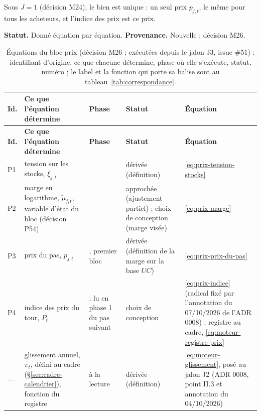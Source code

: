 \documentclass[11pt,a4paper]{article}
\begin{document}
Sous $J = 1$ (décision M24), le bien est unique : un seul prix $p_{j,t}$, le même pour tous les acheteurs, et l'indice des prix est ce prix.

\textbf{Statut.} Donné équation par équation. \textbf{Provenance.} Nouvelle ; décision M26.

\begin{center}\footnotesize
\setlength{\tabcolsep}{4pt}
\begin{longtable}{>{\raggedright\arraybackslash}p{0.8cm}>{\raggedright\arraybackslash}p{4.4cm}>{\raggedright\arraybackslash}p{1.4cm}>{\raggedright\arraybackslash}p{3.6cm}>{\raggedright\arraybackslash}p{4.5cm}}
\caption{Équations du bloc prix (décision M26 ; exécutées depuis le jalon J3, issue \#51) : identifiant d'origine, ce que chacune détermine, phase où elle s'exécute, statut, numéro ; le label et la fonction qui porte sa balise sont au tableau~\ref{tab:correspondance}.}\label{tab:prix-equations}\\
\toprule
\textbf{Id.} & \textbf{Ce que l'équation détermine} & \textbf{Phase} & \textbf{Statut} & \textbf{Équation}\\
\midrule
\endfirsthead
\toprule
\textbf{Id.} & \textbf{Ce que l'équation détermine} & \textbf{Phase} & \textbf{Statut} & \textbf{Équation}\\
\midrule
\endhead
P1 & tension sur les stocks, $\xi_{j,t}$ & 5 & dérivée (définition) & \eqref{eq:prix-tension-stocks}\\
P2 & marge en logarithme, $\tilde\mu_{j,t}$, variable d'état du bloc (décision P54) & 5 & approchée (ajustement partiel) ; choix de conception (marge visée) & \eqref{eq:prix-marge}\\
P3 & prix du pas, $p_{j,t}$ & 5, premier bloc & dérivée (définition de la marge sur la base $\mathit{UC}$) & \eqref{eq:prix-prix-du-pas}\\
P4 & indice des prix du tour, $P_t$ & 5 ; lu en phase 1 du pas suivant & choix de conception & \eqref{eq:prix-indice} (radical fixé par l'annotation du 07/10/2026 de l'ADR 0008) ; registre au cadre, \eqref{eq:moteur-registre-prix}\\
--- & glissement annuel, $\pi_t$, défini au cadre (\S\ref{sec:cadre-calendrier}), fonction du registre & à la lecture & dérivée (définition) & \eqref{eq:moteur-glissement}, posé au jalon J2 (ADR 0008, point II.3 et annotation du 04/10/2026)\\
\bottomrule
\end{longtable}
\end{center}
\end{document}

